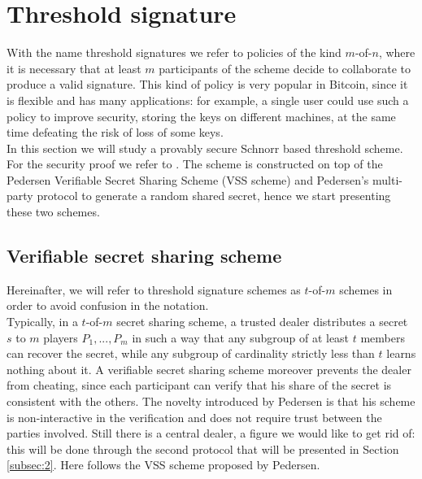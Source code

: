 \bigskip

\bigskip

\section{Threshold signature}
\label{threshold}
With the name threshold signatures we refer to policies of the kind $m$-of-$n$, where it is necessary that at least $m$ participants of the scheme decide to collaborate to produce a valid signature. This kind of policy is very popular in Bitcoin, since it is flexible and has many applications: for example, a single user could use such a policy to improve security, storing the keys on different machines, at the same time defeating the risk of loss of some keys. 
\\
In this section we will study a provably secure Schnorr based threshold scheme. For the security proof we refer to \cite{RefWork:14}. The scheme is constructed on top of the Pedersen Verifiable Secret Sharing Scheme (VSS scheme) and Pedersen's multi-party protocol to generate a random shared secret, hence we start presenting these two schemes.

\bigskip

\subsection{Verifiable secret sharing scheme}
\label{subsec:1}
Hereinafter, we will refer to threshold signature schemes as $t$-of-$m$ schemes in order to avoid confusion in the notation.
\\
Typically, in a $t$-of-$m$ secret sharing scheme, a trusted dealer distributes a secret $s$ to $m$ players $P_1, ..., P_m$ in such a way that any subgroup of at least $t$ members can recover the secret, while any subgroup of cardinality strictly less than $t$ learns nothing about it. A verifiable secret sharing scheme moreover prevents the dealer from cheating, since each participant can verify that his share of the secret is consistent with the others. The novelty introduced by Pedersen is that his scheme is non-interactive in the verification and does not require trust between the parties involved. Still there is a central dealer, a figure we would like to get rid of: this will be done through the second protocol that will be presented in Section \ref{subsec:2}. Here follows the VSS scheme proposed by Pedersen.


